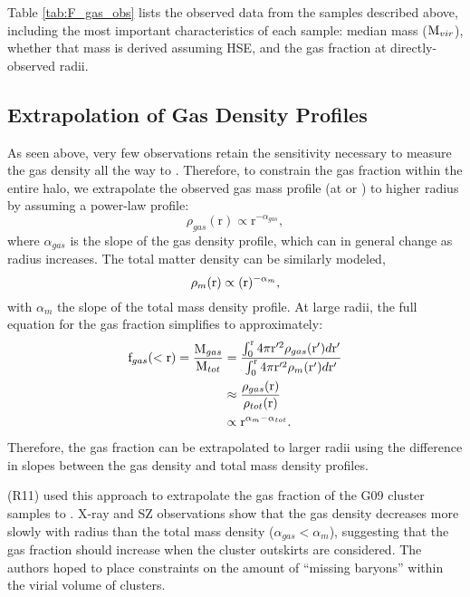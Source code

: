 Table \ref{tab:F_gas_obs} lists the observed data from the samples
described above, including the most important characteristics of each
sample: median mass ($\textrm{M\ensuremath{_{vir}}}$), whether that mass is derived
assuming HSE, and the gas fraction at directly-observed radii.



\subsection{Extrapolation of Gas Density Profiles}
\label{sec:Gas.Extrapolation}
As seen above, very few observations retain the sensitivity necessary to
measure the gas density all the way to \rvir{}. Therefore, to
constrain the gas fraction within the entire halo, we extrapolate
the observed gas mass profile (at \rtwo{} or \rfive{}) to higher
radius by assuming a power-law profile:
\begin{equation}
\rho_{gas}(\textrm{r}) \propto \textrm{r}^{-\alpha_{gas}}, \nonumber
\end{equation}
where $\alpha{}_{gas}$ is the slope of the gas density profile, which can in
general change as radius increases. The total
matter density can be similarly modeled,
\begin{equation}
\rho_{m}(\textrm{r}) \propto (\textrm{r})^{-\alpha_{m}}, \nonumber
\end{equation}
with $\alpha{}_m$ the slope of the total mass density profile. At
large radii, the full equation for the gas fraction simplifies to approximately:
\begin{align}
\textrm{f\ensuremath{_{gas}}}(<\textrm{r}) = \frac{\textrm{M}_{gas}}{\textrm{M}_{tot}} &=
\frac{\int_0^{\textrm{r}} 4\pi{}\textrm{r}'^2\rho_{gas}(\textrm{r}')d\textrm{r}'}{\int_0^{\textrm{r}}
  4\pi{}\textrm{r}'^2\rho_{m}(\textrm{r}')d\textrm{r}'} \nonumber \\ & \approx
\frac{\rho_{gas}(\textrm{r})}{\rho_{tot}(\textrm{r})} \nonumber\\ &\propto \textrm{r}^{\alpha_{m} - \alpha_{tot}}. \nonumber
\end{align}
Therefore, the gas fraction can be extrapolated to larger radii using
the difference in slopes between the gas density and total mass
density profiles.

\textbf{\citet{Rasheed2011}} (R11) used this approach to extrapolate
the gas fraction of the G09 cluster samples to \rvir{}. X-ray and SZ
observations show that the gas density decreases more slowly with
radius than the total mass density ($\alpha_{gas} < \alpha_{m}$),
suggesting that the gas fraction should increase when the cluster
outskirts are considered. The authors hoped to place constraints on
the amount of ``missing baryons'' within the virial volume of
clusters.

